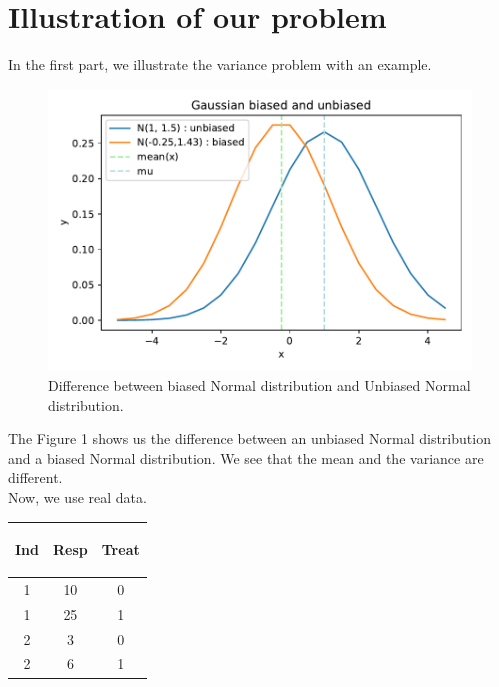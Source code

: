 \documentclass{article}
\begin{document}
\section{Illustration of our problem}
In the first part, we illustrate the variance problem with an example. 
\begin{figure}[H]
    \begin{center}
    \includegraphics[scale=0.7]{./images/Biased_normal_distri.pdf}
    \caption{Difference between biased Normal distribution and Unbiased Normal distribution.}
    \end{center}
\end{figure}
The Figure 1 shows us the difference between an unbiased Normal distribution and a biased Normal distribution. We see that the mean and the variance are different.\\
Now, we use real data.\\
\begin{table}[h!]
        \centering
        \begin{tabular}{| c | c | c|}
        \hline
        \begin{bf} Ind \end{bf} &
        \begin{bf} Resp \end{bf} &
        \begin{bf} Treat \end{bf} \\
        \hline
        1 &  10 & 0\\
        1 & 25 & 1 \\
        2 & 3 & 0 \\
        2 &  6 & 1\\
        \hline
        \end{tabular}
\end{table}
\end{document}
